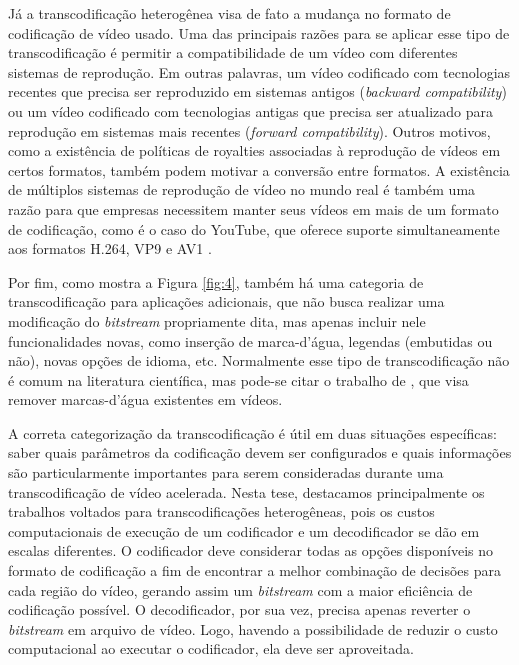 Já a transcodificação heterogênea visa de fato a mudança no formato de codificação de vídeo usado. Uma das principais razões para se aplicar esse tipo de transcodificação é permitir a compatibilidade de um vídeo com diferentes sistemas de reprodução. Em outras palavras, um vídeo codificado com tecnologias recentes que precisa ser reproduzido em sistemas antigos (\textit{backward compatibility}) ou um vídeo codificado com tecnologias antigas que precisa ser atualizado para reprodução em sistemas mais recentes (\textit{forward compatibility}). Outros motivos, como a existência de políticas de royalties associadas à reprodução de vídeos em certos formatos, também podem motivar a conversão entre formatos. A existência de múltiplos sistemas de reprodução de vídeo no mundo real é também uma razão para que empresas necessitem manter seus vídeos em mais de um formato de codificação, como é o caso do YouTube, que oferece suporte simultaneamente aos formatos H.264, VP9 e AV1 \cite{bib:bitmovin_ott_report_2020} \cite{bib:5to9google}.

Por fim, como mostra a Figura \ref{fig:4}, também há uma categoria de transcodificação para aplicações adicionais, que não busca realizar uma modificação do \textit{bitstream} propriamente dita, mas apenas incluir nele funcionalidades novas, como inserção de marca-d'água, legendas (embutidas ou não), novas opções de idioma, etc. Normalmente esse tipo de transcodificação não é comum na literatura científica, mas pode-se citar o trabalho de \citet{bib:watermark}, que visa remover marcas-d’água existentes em vídeos.

A correta categorização da transcodificação é útil em duas situações específicas: saber quais parâmetros da codificação devem ser configurados e quais informações são particularmente importantes para serem consideradas durante uma transcodificação de vídeo acelerada. Nesta tese, destacamos principalmente os trabalhos voltados para transcodificações heterogêneas, pois os custos computacionais de execução de um codificador e um decodificador se dão em escalas diferentes. O codificador deve considerar todas as opções disponíveis no formato de codificação a fim de encontrar a melhor combinação de decisões para cada região do vídeo, gerando assim um \textit{bitstream} com a maior eficiência de codificação possível. O decodificador, por sua vez, precisa apenas reverter o \textit{bitstream} em arquivo de vídeo. Logo, havendo a possibilidade de reduzir o custo computacional ao executar o codificador, ela deve ser aproveitada.

